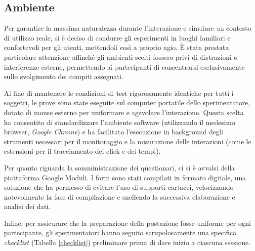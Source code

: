 \subsection{Ambiente}
Per garantire la massima naturalezza durante l'interazione e simulare un contesto di utilizzo reale, si è deciso di condurre gli esperimenti in luoghi familiari e confortevoli per gli utenti, mettendoli così a proprio agio. È stata prestata particolare attenzione affinché gli ambienti scelti fossero privi di distrazioni o interferenze esterne, permettendo ai partecipanti di concentrarsi esclusivamente sullo svolgimento dei compiti assegnati.

Al fine di mantenere le condizioni di test rigorosamente identiche per tutti i soggetti, le prove sono state eseguite sul computer portatile dello sperimentatore, dotato di mouse esterno per uniformare e agevolare l'interazione. Questa scelta ha consentito di standardizzare l'ambiente software (utilizzando il medesimo browser, \textit{Google Chrome}) e ha facilitato l'esecuzione in background degli strumenti necessari per il monitoraggio e la misurazione delle interazioni (come le estensioni per il tracciamento dei click e dei tempi).

Per quanto riguarda la somministrazione dei questionari, ci si è avvalsi della piattaforma Google Moduli. I form sono stati compilati in formato digitale, una soluzione che ha permesso di evitare l'uso di supporti cartacei, velocizzando notevolmente la fase di compilazione e snellendo la successiva elaborazione e analisi dei dati. 

Infine, per assicurare che la preparazione della postazione fosse uniforme per ogni partecipante, gli sperimentatori hanno seguito scrupolosamente una specifica \textit{checklist} (Tabella \ref{checklist}) preliminare prima di dare inizio a ciascuna sessione.